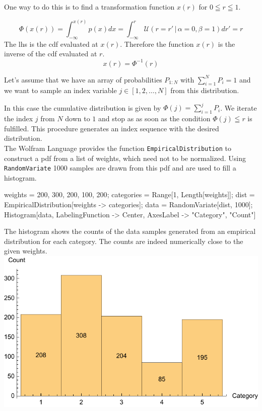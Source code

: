 \documentclass{tstextbook}
\begin{document}
One way to do this is to find a transformation function $x(r)$ for $0\leqq r \leqq 1$.

\begin{equation}
  \Phi(x(r))=\int_{-\infty}^{x(r)}p(x)dx = \int_{-\infty}^{r}\mathcal{U}(r=r'\,\vert\,\alpha=0,\beta=1)dr'=r
\end{equation}
The lhs is the cdf evaluated at $x(r)$. Therefore the function $x(r)$ is the inverse of the cdf evaluated at $r$.
\begin{equation}
  x(r) = \Phi^{-1}(r)
\end{equation}

\begin{example}
Let's assume that we have an array of probabilities $P_{1:N}$ with $\sum_{i=1}^{N}P_i=1$ and we want to sample an index variable $j\in [1,2,\ldots,N]$ from this distribution.

In this case the cumulative distribution is given by $\Phi(j)=\sum_{i=1}^{j}P_i$.
We iterate the index $j$ from $N$ down to $1$ and stop as as soon as the condition $\Phi(j)\leqq r$ is fulfilled. This procedure generates an index sequence with the desired distribution.\\

The Wolfram Language provides the function \texttt{EmpiricalDistribution} to construct a pdf from a list of weights, which need not to be normalized. Using \texttt{RandomVariate} 1000 samples are drawn from this pdf and are used to fill a histogram.
 
\begin{mathematica}
weights = {200, 300, 200, 100, 200};
categories = Range[1, Length[weights]];
dist = EmpiricalDistribution[weights -> categories];
data = RandomVariate[dist, 1000];
Histogram[data,
          LabelingFunction -> Center,
          AxesLabel -> {"Category", "Count"}]
\end{mathematica}

The histogram shows the counts of the data samples generated from an empirical distribution for each category. The counts are indeed numerically close to the given weights.\\

 \includegraphics{images/sampling_from_discrete_distribution.pdf}   
\end{example}
\end{document}

